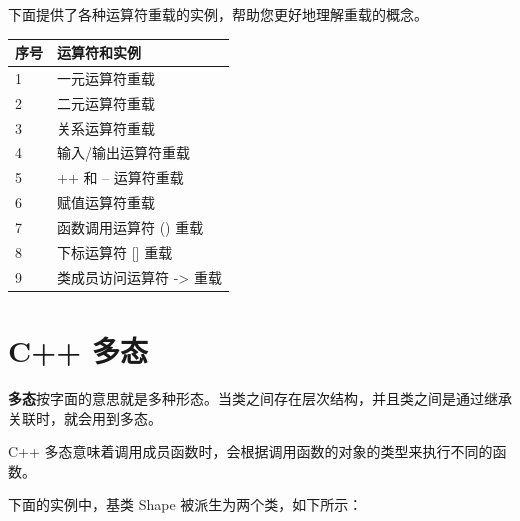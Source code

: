 \documentclass[
]{article}
\begin{document}
下面提供了各种运算符重载的实例，帮助您更好地理解重载的概念。

\begin{longtable}[]{@{}ll@{}}
\toprule
序号 & 运算符和实例 \\
\midrule
\endhead
1 & 一元运算符重载 \\
2 & 二元运算符重载 \\
3 & 关系运算符重载 \\
4 & 输入/输出运算符重载 \\
5 & ++ 和 -- 运算符重载 \\
6 & 赋值运算符重载 \\
7 & 函数调用运算符 () 重载 \\
8 & 下标运算符 {[}{]} 重载 \\
9 & 类成员访问运算符 -\textgreater{} 重载 \\
\bottomrule
\end{longtable}

\hypertarget{c-ux591aux6001}{%
\section{C++ 多态}\label{c-ux591aux6001}}

\textbf{多态}按字面的意思就是多种形态。当类之间存在层次结构，并且类之间是通过继承关联时，就会用到多态。

C++
多态意味着调用成员函数时，会根据调用函数的对象的类型来执行不同的函数。

下面的实例中，基类 Shape 被派生为两个类，如下所示：
\end{document}
